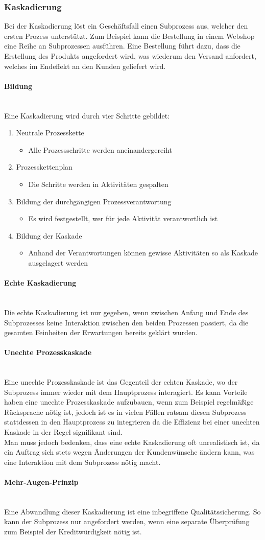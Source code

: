 \documentclass{article}
\newcommand{\paragraphlb}[1]{\paragraph{#1}\mbox{}\\}
\begin{document}
  \subsubsection{Kaskadierung}
  Bei der Kaskadierung löst ein Geschäftsfall einen Subprozess aus, welcher den ersten Prozess unterstützt. Zum Beispiel kann die Bestellung in einem Webshop eine Reihe an Subprozessen ausführen. Eine Bestellung führt dazu, dass die Erstellung des Produkts angefordert wird, was wiederum den Versand anfordert, welches im Endeffekt an den Kunden geliefert wird.
  \paragraphlb{Bildung}
  Eine Kaskadierung wird durch vier Schritte gebildet:
  \begin{enumerate}
    \item{Neutrale Prozesskette}
    \begin{itemize}
      \item{Alle Prozessschritte werden aneinandergereiht}
    \end{itemize}
    \item{Prozesskettenplan}
    \begin{itemize}
      \item{Die Schritte werden in Aktivitäten gespalten}
    \end{itemize}
    \item{Bildung der durchgängigen Prozessverantwortung}
    \begin{itemize}
      \item{Es wird festgestellt, wer für jede Aktivität verantwortlich ist}
    \end{itemize}
    \item{Bildung der Kaskade}
    \begin{itemize}
      \item{Anhand der Verantwortungen können gewisse Aktivitäten so als Kaskade ausgelagert werden}
    \end{itemize}
  \end{enumerate}
  \paragraphlb{Echte Kaskadierung}
  Die echte Kaskadierung ist nur gegeben, wenn zwischen Anfang und Ende des Subprozesses keine Interaktion zwischen den beiden Prozessen passiert, da die gesamten Feinheiten der Erwartungen bereits geklärt wurden.
  \paragraphlb{Unechte Prozesskaskade}
  Eine unechte Prozesskaskade ist das Gegenteil der echten Kaskade, wo der Subprozess immer wieder mit dem Hauptprozess interagiert. Es kann Vorteile haben eine unechte Prozesskaskade aufzubauen, wenn zum Beispiel regelmäßige Rücksprache nötig ist, jedoch ist es in vielen Fällen ratsam diesen Subprozess stattdessen in den Hauptprozess zu integrieren da die Effizienz bei einer unechten Kaskade in der Regel signifikant sind. \\
  Man muss jedoch bedenken, dass eine echte Kaskadierung oft unrealistisch ist, da ein Auftrag sich stets wegen Änderungen der Kundenwünsche ändern kann, was eine Interaktion mit dem Subprozess nötig macht.
  \paragraphlb{Mehr-Augen-Prinzip}
  Eine Abwandlung dieser Kaskadierung ist eine inbegriffene Qualitätssicherung. So kann der Subprozess nur angefordert werden, wenn eine separate Überprüfung zum Beispiel der Kreditwürdigkeit nötig ist.
\end{document}
